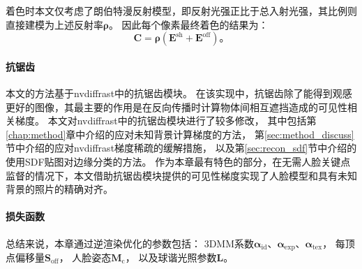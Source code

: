 着色时本文仅考虑了朗伯特漫反射模型，即反射光强正比于总入射光强，其比例则直接建模为上述反射率$\mathbf{\rho}$。
因此每个像素最终着色的结果为：
\begin{equation}
    \mathbf{C} = \mathbf{\rho} \left(\mathbf{E}^\mathrm{sh} + \mathbf{E}^\mathrm{off}\right) \text{。}
\end{equation}

\paragraph{抗锯齿}
本文的方法基于nvdiffrast中的抗锯齿模块。
在该实现中，抗锯齿除了能得到观感更好的图像，其最主要的作用是在反向传播时计算物体间相互遮挡造成的可见性相关梯度。
本文对nvdiffrast中的抗锯齿模块进行了较多修改，
其中包括第\ref{chap:method}章中介绍的应对未知背景计算梯度的方法，
第\ref{sec:method_discuss}节中介绍的应对nvdiffrast梯度稀疏的缓解措施，
以及第\ref{sec:recon_sdf}节中介绍的使用SDF贴图对边缘分类的方法。
作为本章最有特色的部分，在无需人脸关键点监督的情况下，本文借助抗锯齿模块提供的可见性梯度实现了人脸模型和具有未知背景的照片的精确对齐。

\paragraph{损失函数}
总结来说，本章通过逆渲染优化的参数包括：
3DMM系数$\mathbf{\alpha}_\mathrm{id}$、$\mathbf{\alpha}_\mathrm{exp}$、$\mathbf{\alpha}_\mathrm{tex}$，
每顶点偏移量$\mathbf{S}_\mathrm{off}$，
人脸姿态$\mathbf{M}_\mathrm{c}$，
以及球谐光照参数$\mathbf{L}$。

